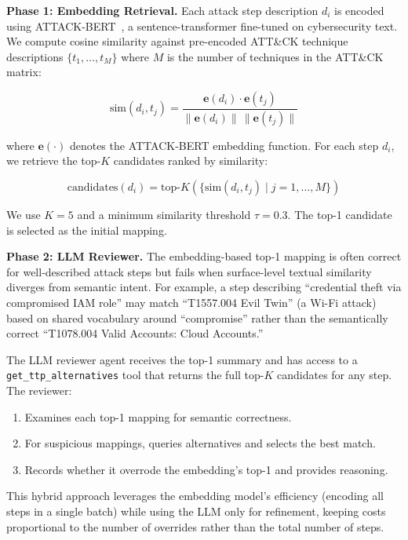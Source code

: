 \textbf{Phase 1: Embedding Retrieval.}
Each attack step description $d_i$ is encoded using ATTACK-BERT~\cite{attackbert}, a sentence-transformer fine-tuned on cybersecurity text. We compute cosine similarity against pre-encoded ATT\&CK technique descriptions $\{t_1, \ldots, t_M\}$ where $M$ is the number of techniques in the ATT\&CK matrix:

\begin{equation}
\text{sim}(d_i, t_j) = \frac{\mathbf{e}(d_i) \cdot \mathbf{e}(t_j)}{\|\mathbf{e}(d_i)\| \, \|\mathbf{e}(t_j)\|}
\label{eq:cosine}
\end{equation}

where $\mathbf{e}(\cdot)$ denotes the ATTACK-BERT embedding function. For each step $d_i$, we retrieve the top-$K$ candidates ranked by similarity:

\begin{equation}
\text{candidates}(d_i) = \text{top-}K\left(\{\text{sim}(d_i, t_j) \mid j = 1, \ldots, M\}\right)
\label{eq:topk}
\end{equation}

We use $K=5$ and a minimum similarity threshold $\tau = 0.3$. The top-1 candidate is selected as the initial mapping.

\textbf{Phase 2: LLM Reviewer.}
The embedding-based top-1 mapping is often correct for well-described attack steps but fails when surface-level textual similarity diverges from semantic intent. For example, a step describing ``credential theft via compromised IAM role'' may match ``T1557.004 Evil Twin'' (a Wi-Fi attack) based on shared vocabulary around ``compromise'' rather than the semantically correct ``T1078.004 Valid Accounts: Cloud Accounts.''

The LLM reviewer agent receives the top-1 summary and has access to a \texttt{get\_ttp\_alternatives} tool that returns the full top-$K$ candidates for any step. The reviewer:
\begin{enumerate}
    \item Examines each top-1 mapping for semantic correctness.
    \item For suspicious mappings, queries alternatives and selects the best match.
    \item Records whether it overrode the embedding's top-1 and provides reasoning.
\end{enumerate}

This hybrid approach leverages the embedding model's efficiency (encoding all steps in a single batch) while using the LLM only for refinement, keeping costs proportional to the number of overrides rather than the total number of steps.

